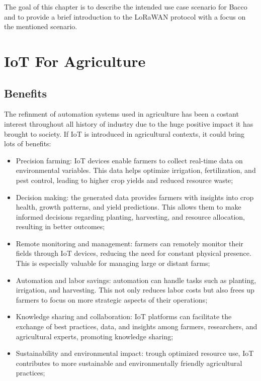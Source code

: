 

The goal of this chapter is to describe the intended use case scenario for Bacco and to provide a brief
introduction to the \gls{LoRaWAN} protocol with a focus on the mentioned scenario.

\section{IoT For Agriculture}

\subsection{Benefits}
The refinment of automation systems used in agriculture has been a costant interest throughout all history of
industry due to the huge positive impact it has brought to society. If \gls{IoT} is introduced
in agricultural contexts, it could bring lots of benefits:
\begin{itemize}
    \item Precision farming: IoT devices enable farmers to collect real-time data on environmental variables. This data
        helps optimize irrigation, fertilization, and pest control, leading to higher crop yields and reduced resource
        waste;
    \item Decision making: the generated data provides farmers with insights into crop health, growth
        patterns, and yield predictions. This allows them to make informed decisions regarding planting, harvesting, and
        resource allocation, resulting in better outcomes;
    \item Remote monitoring and management: farmers can remotely monitor their fields through IoT devices,
        reducing the need for constant physical presence. This is especially valuable for managing large or distant farms;
    \item Automation and labor savings: automation can handle tasks such as planting, irrigation, and
        harvesting. This not only reduces labor costs but also frees up farmers to focus on more strategic aspects of
        their operations;
    \item Knowledge sharing and collaboration: IoT platforms can facilitate the exchange of best practices, data, and
        insights among farmers, researchers, and agricultural experts, promoting knowledge sharing;
    \item Sustainability and environmental impact: trough optimized resource use, IoT contributes to more sustainable
        and environmentally friendly agricultural practices;
\end{itemize}

